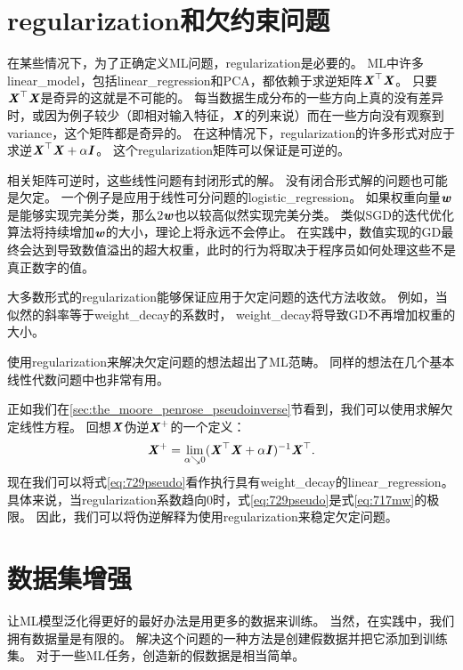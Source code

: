 \section{\gls{regularization}和欠约束问题}
\label{sec:regularization_and_under_constrained_problems}
在某些情况下，为了正确定义\gls{ML}问题，\gls{regularization}是必要的。
\gls{ML}中许多\gls{linear_model}，包括\gls{linear_regression}和PCA，都依赖于求逆矩阵$\boldsymbol{\mathit{X}}^\top\boldsymbol{\mathit{X}}$。
只要$\boldsymbol{\mathit{X}}^\top\boldsymbol{\mathit{X}}$是奇异的这就是不可能的。
每当数据生成分布的一些方向上真的没有差异时，或因为例子较少（即相对输入特征，$\boldsymbol{\mathit{X}}$的列来说）而在一些方向没有观察到\gls{variance}，这个矩阵都是奇异的。
在这种情况下，\gls{regularization}的许多形式对应于求逆$\boldsymbol{\mathit{X}}^\top\boldsymbol{\mathit{X}} + \alpha \boldsymbol{\mathit{I}}$。
这个\gls{regularization}矩阵可以保证是可逆的。

相关矩阵可逆时，这些线性问题有封闭形式的解。
没有闭合形式解的问题也可能是欠定。
一个例子是应用于线性可分问题的\gls{logistic_regression}。
如果权重向量$\boldsymbol{\mathit{w}}$是能够实现完美分类，那么$2 \boldsymbol{\mathit{w}}$也以较高似然实现完美分类。
类似\gls{SGD}的迭代优化算法将持续增加$\boldsymbol{\mathit{w}}$的大小，理论上将永远不会停止。
在实践中，数值实现的\gls{GD}最终会达到导致数值溢出的超大权重，此时的行为将取决于程序员如何处理这些不是真正数字的值。

大多数形式的\gls{regularization}能够保证应用于欠定问题的迭代方法收敛。
例如，当似然的斜率等于\gls{weight_decay}的系数时， \gls{weight_decay}将导致\gls{GD}不再增加权重的大小。

使用\gls{regularization}来解决欠定问题的想法超出了\gls{ML}范畴。
同样的想法在几个基本线性代数问题中也非常有用。


正如我们在\ref{sec:the_moore_penrose_pseudoinverse}节看到，我们可以使用求解欠定线性方程。 
回想$\boldsymbol{\mathit{X}}$伪逆$\boldsymbol{\mathit{X}}^+$的一个定义：
\begin{align} 
\label{eq:729pseudo}
 \boldsymbol{\mathit{X}}^+ = \lim_{\alpha \searrow 0} (\boldsymbol{\mathit{X}}^\top \boldsymbol{\mathit{X}} + \alpha \boldsymbol{\mathit{I}})^{-1}\boldsymbol{\mathit{X}}^\top.
\end{align}
现在我们可以将式\ref{eq:729pseudo}看作执行具有\gls{weight_decay}的\gls{linear_regression}。
具体来说，当\gls{regularization}系数趋向0时，式\ref{eq:729pseudo}是式\ref{eq:717mw}的极限。
因此，我们可以将伪逆解释为使用\gls{regularization}来稳定欠定问题。


\section{数据集增强}
\label{sec:dataset_augmentation}
让\gls{ML}模型泛化得更好的最好办法是用更多的数据来训练。
当然，在实践中，我们拥有数据量是有限的。
解决这个问题的一种方法是创建假数据并把它添加到训练集。
对于一些\gls{ML}任务，创造新的假数据是相当简单。

